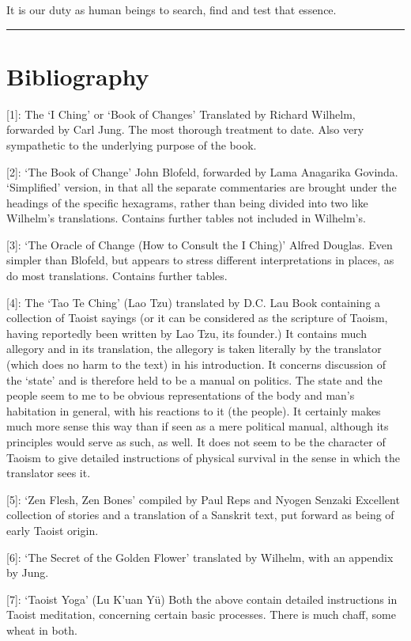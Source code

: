 \documentclass[11pt]{book}
\begin{document}
It is our duty as human beings to search, find and test that essence.

\begin{center}\rule{0.5\linewidth}{0.5pt}\end{center}

\hypertarget{bibliography}{%
\section{Bibliography}\label{bibliography}}

{[}1{]}: The `I Ching' or `Book of Changes' Translated by Richard Wilhelm, forwarded by Carl Jung. The most thorough treatment to date. Also very sympathetic to the underlying purpose of the book.

{[}2{]}: `The Book of Change' John Blofeld, forwarded by Lama Anagarika Govinda. `Simplified' version, in that all the separate commentaries are brought under the headings of the specific hexagrams, rather than being divided into two like Wilhelm's translations. Contains further tables not included in Wilhelm's.

{[}3{]}: `The Oracle of Change (How to Consult the I Ching)' Alfred Douglas. Even simpler than Blofeld, but appears to stress different interpretations in places, as do most translations. Contains further tables.

{[}4{]}: The `Tao Te Ching' (Lao Tzu) translated by D.C. Lau Book containing a collection of Taoist sayings (or it can be considered as the scripture of Taoism, having reportedly been written by Lao Tzu, its founder.) It contains much allegory and in its translation, the allegory is taken literally by the translator (which does no harm to the text) in his introduction. It concerns discussion of the `state' and is therefore held to be a manual on politics. The state and the people seem to me to be obvious representations of the body and man's habitation in general, with his reactions to it (the people). It certainly makes much more sense this way than if seen as a mere political manual, although its principles would serve as such, as well. It does not seem to be the character of Taoism to give detailed instructions of physical survival in the sense in which the translator sees it.

{[}5{]}: `Zen Flesh, Zen Bones' compiled by Paul Reps and Nyogen Senzaki Excellent collection of stories and a translation of a Sanskrit text, put forward as being of early Taoist origin.

{[}6{]}: `The Secret of the Golden Flower' translated by Wilhelm, with an appendix by Jung.

{[}7{]}: `Taoist Yoga' (Lu K'uan Yü) Both the above contain detailed instructions in Taoist meditation, concerning certain basic processes. There is much chaff, some wheat in both.

\backmatter
\end{document}
